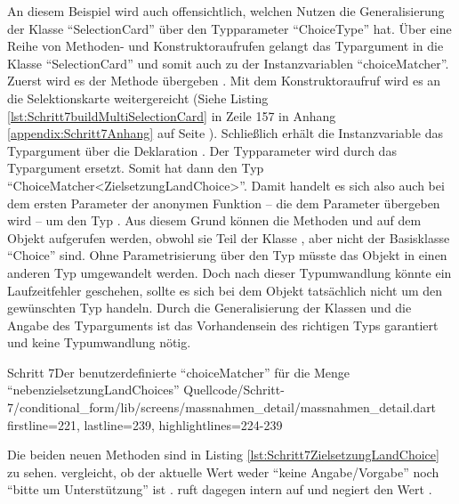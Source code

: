 An diesem Beispiel wird auch offensichtlich,
welchen Nutzen die Generalisierung der Klasse \enquote{SelectionCard} über den Typparameter \enquote{ChoiceType} hat.
Über eine Reihe von Methoden- und Konstruktoraufrufen gelangt das Typargument  in die Klasse \enquote{SelectionCard} und somit auch zu der Instanzvariablen \enquote{choiceMatcher}. Zuerst wird es der Methode  übergeben . 
Mit dem Konstruktoraufruf  wird es an die Selektionskarte weitergereicht (Siehe Listing \ref{lst:Schritt7buildMultiSelectionCard} in Zeile 157 in Anhang \ref{appendix:Schritt7Anhang} auf Seite \pageref{lst:Schritt7buildMultiSelectionCard}).
Schließlich erhält die Instanzvariable das Typargument über die Deklaration  .
Der Typparameter wird durch das Typargument ersetzt.
Somit hat  dann den Typ \enquote{ChoiceMatcher<ZielsetzungLandChoice>}.
Damit handelt es sich also auch bei dem ersten Parameter  der anonymen Funktion --
die dem Parameter  übergeben wird  -- um den Typ .
Aus diesem Grund können die Methoden   und   auf dem Objekt  aufgerufen werden,
obwohl sie Teil der Klasse , aber nicht der Basisklasse \enquote{Choice} sind.
Ohne Parametrisierung über den Typ müsste das Objekt  in einen anderen Typ umgewandelt werden.
Doch nach dieser Typumwandlung könnte ein Laufzeitfehler geschehen, sollte es sich bei dem Objekt tatsächlich nicht um den gewünschten Typ handeln.
Durch die Generalisierung der Klassen und die Angabe des Typarguments ist das Vorhandensein des richtigen Typs garantiert und keine Typumwandlung nötig.

\begin{alexlisting}{Schritt 7}{Der benutzerdefinierte \enquote{choiceMatcher} für die Menge \enquote{nebenzielsetzungLandChoices}}
  {Quellcode/Schritt-7/conditional_form/lib/screens/massnahmen_detail/massnahmen_detail.dart}
  {firstline=221, lastline=239, highlightlines={224-239}}
  \label{lst:Schritt7buildMultiSelectionCardZielsetzungLandChoice}
\end{alexlisting}

Die beiden neuen Methoden sind in Listing \ref{lst:Schritt7ZielsetzungLandChoice} zu sehen.  vergleicht, ob der aktuelle Wert weder \enquote{keine Angabe/Vorgabe} noch \enquote{bitte um Unterstützung} ist .
 ruft dagegen intern  auf und negiert den Wert .


